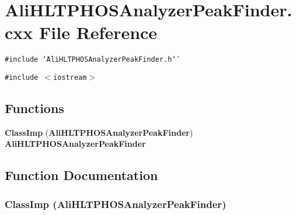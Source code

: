 \section{Ali\-HLTPHOSAnalyzer\-Peak\-Finder.cxx File Reference}
\label{AliHLTPHOSAnalyzerPeakFinder_8cxx}
{\tt \#include \char`\"{}Ali\-HLTPHOSAnalyzer\-Peak\-Finder.h\char`\"{}}\par
{\tt \#include $<$iostream$>$}\par
\subsection*{Functions}
\begin{CompactItemize}
\item 
{\bf Class\-Imp} ({\bf Ali\-HLTPHOSAnalyzer\-Peak\-Finder}) {\bf Ali\-HLTPHOSAnalyzer\-Peak\-Finder}
\end{CompactItemize}


\subsection{Function Documentation}
\subsubsection{\setlength{\rightskip}{0pt plus 5cm}Class\-Imp ({\bf Ali\-HLTPHOSAnalyzer\-Peak\-Finder})}\label{AliHLTPHOSAnalyzerPeakFinder_8cxx_a0}


